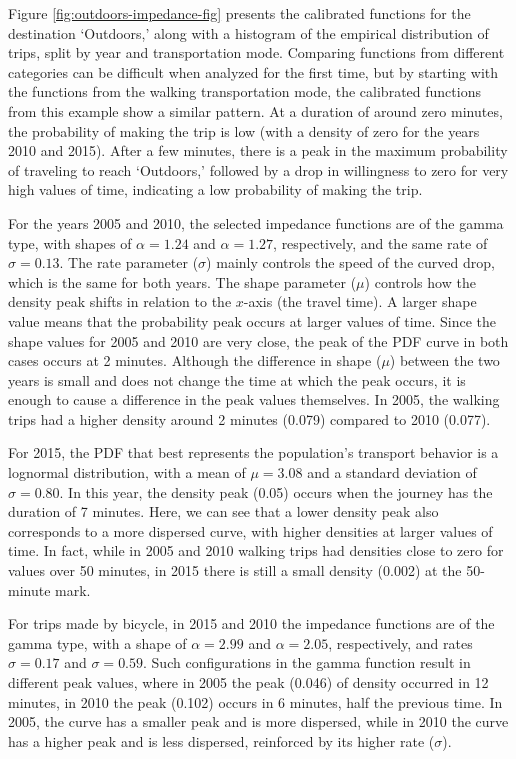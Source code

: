 \documentclass[preprint, 3p,
authoryear]{elsarticle} %
\begin{document}
Figure \ref{fig:outdoors-impedance-fig} presents the calibrated
functions for the destination `Outdoors,' along with a histogram of the
empirical distribution of trips, split by year and transportation mode.
Comparing functions from different categories can be difficult when
analyzed for the first time, but by starting with the functions from the
walking transportation mode, the calibrated functions from this example
show a similar pattern. At a duration of around zero minutes, the
probability of making the trip is low (with a density of zero for the
years 2010 and 2015). After a few minutes, there is a peak in the
maximum probability of traveling to reach `Outdoors,' followed by a drop
in willingness to zero for very high values of time, indicating a low
probability of making the trip.

For the years 2005 and 2010, the selected impedance functions are of the
gamma type, with shapes of \(\alpha = 1.24\) and \(\alpha = 1.27\),
respectively, and the same rate of \(\sigma = 0.13\). The rate parameter
(\(\sigma\)) mainly controls the speed of the curved drop, which is the
same for both years. The shape parameter (\(\mu\)) controls how the
density peak shifts in relation to the \(x\)-axis (the travel time). A
larger shape value means that the probability peak occurs at larger
values of time. Since the shape values for 2005 and 2010 are very close,
the peak of the PDF curve in both cases occurs at 2 minutes. Although
the difference in shape (\(\mu\)) between the two years is small and
does not change the time at which the peak occurs, it is enough to cause
a difference in the peak values themselves. In 2005, the walking trips
had a higher density around 2 minutes (0.079) compared to 2010 (0.077).

For 2015, the PDF that best represents the population's transport
behavior is a lognormal distribution, with a mean of \(\mu = 3.08\) and
a standard deviation of \(\sigma = 0.80\). In this year, the density
peak (0.05) occurs when the journey has the duration of 7 minutes. Here,
we can see that a lower density peak also corresponds to a more
dispersed curve, with higher densities at larger values of time. In
fact, while in 2005 and 2010 walking trips had densities close to zero
for values over 50 minutes, in 2015 there is still a small density
(0.002) at the 50-minute mark.

For trips made by bicycle, in 2015 and 2010 the impedance functions are
of the gamma type, with a shape of \(\alpha = 2.99\) and
\(\alpha = 2.05\), respectively, and rates \(\sigma = 0.17\) and
\(\sigma = 0.59\). Such configurations in the gamma function result in
different peak values, where in 2005 the peak (0.046) of density
occurred in 12 minutes, in 2010 the peak (0.102) occurs in 6 minutes,
half the previous time. In 2005, the curve has a smaller peak and is
more dispersed, while in 2010 the curve has a higher peak and is less
dispersed, reinforced by its higher rate (\(\sigma\)).
\end{document}
